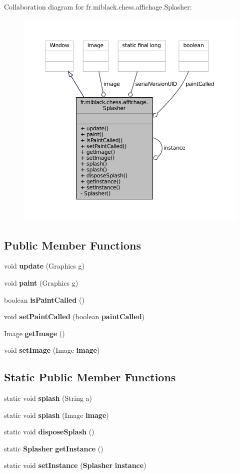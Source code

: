 Collaboration diagram for fr.\-miblack.\-chess.\-affichage.\-Splasher\-:
\nopagebreak
\begin{figure}[H]
\begin{center}
\leavevmode
\includegraphics[width=350pt]{classfr_1_1miblack_1_1chess_1_1affichage_1_1Splasher__coll__graph}
\end{center}
\end{figure}
\subsection*{Public Member Functions}
\begin{DoxyCompactItemize}
\item 
void {\bf update} (Graphics g)
\item 
void {\bf paint} (Graphics g)
\item 
boolean {\bf is\-Paint\-Called} ()
\item 
void {\bf set\-Paint\-Called} (boolean {\bf paint\-Called})
\item 
Image {\bf get\-Image} ()
\item 
void {\bf set\-Image} (Image {\bf image})
\end{DoxyCompactItemize}
\subsection*{Static Public Member Functions}
\begin{DoxyCompactItemize}
\item 
static void {\bf splash} (String a)
\item 
static void {\bf splash} (Image {\bf image})
\item 
static void {\bf dispose\-Splash} ()
\item 
static {\bf Splasher} {\bf get\-Instance} ()
\item 
static void {\bf set\-Instance} ({\bf Splasher} {\bf instance})
\end{DoxyCompactItemize}

